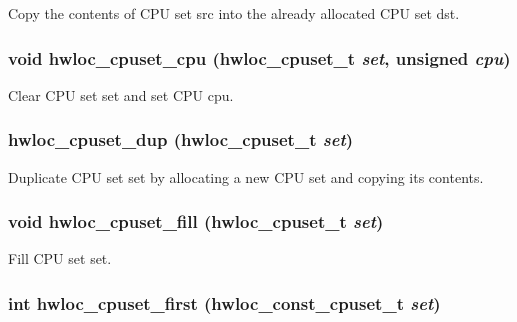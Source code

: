 Copy the contents of CPU set {\ttfamily src} into the already allocated CPU set {\ttfamily dst}. \hypertarget{group__hwlocality__cpuset_ga212f2df54a64817dd094550a51b32c4f}{
\subsubsection[{hwloc\_\-cpuset\_\-cpu}]{\setlength{\rightskip}{0pt plus 5cm}void hwloc\_\-cpuset\_\-cpu ({\bf hwloc\_\-cpuset\_\-t} {\em set}, \/  unsigned {\em cpu})}}
\label{group__hwlocality__cpuset_ga212f2df54a64817dd094550a51b32c4f}


Clear CPU set {\ttfamily set} and set CPU {\ttfamily cpu}. \hypertarget{group__hwlocality__cpuset_ga19d8c163e4834ba69c808560aa5a89b3}{
\subsubsection[{hwloc\_\-cpuset\_\-dup}]{ hwloc\_\-cpuset\_\-dup ({\bf hwloc\_\-cpuset\_\-t} {\em set})}}
\label{group__hwlocality__cpuset_ga19d8c163e4834ba69c808560aa5a89b3}


Duplicate CPU set {\ttfamily set} by allocating a new CPU set and copying its contents. \hypertarget{group__hwlocality__cpuset_gad1a6c02ae378aff412c2b843cf8cc3f4}{
\subsubsection[{hwloc\_\-cpuset\_\-fill}]{\setlength{\rightskip}{0pt plus 5cm}void hwloc\_\-cpuset\_\-fill ({\bf hwloc\_\-cpuset\_\-t} {\em set})}}
\label{group__hwlocality__cpuset_gad1a6c02ae378aff412c2b843cf8cc3f4}


Fill CPU set {\ttfamily set}. \hypertarget{group__hwlocality__cpuset_ga9126cbb0970146e1b09df91efc11889b}{
\subsubsection[{hwloc\_\-cpuset\_\-first}]{\setlength{\rightskip}{0pt plus 5cm}int hwloc\_\-cpuset\_\-first ({\bf hwloc\_\-const\_\-cpuset\_\-t} {\em set})}}
\label{group__hwlocality__cpuset_ga9126cbb0970146e1b09df91efc11889b}


